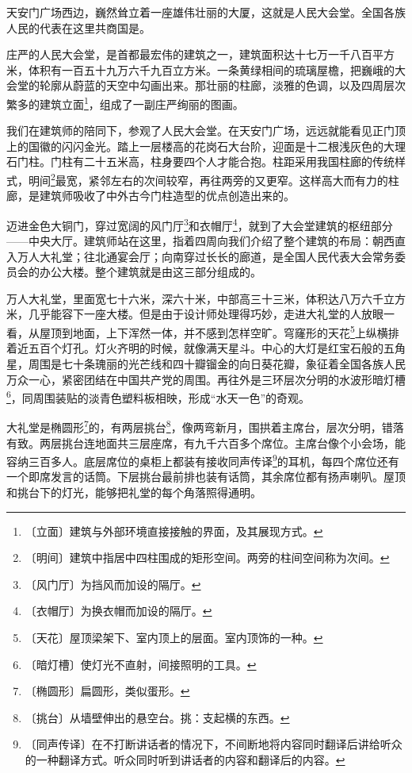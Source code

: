 \documentclass[12pt,UTF-8,openany]{ctexbook}
\begin{document}
\begin{large}
    
    天安门广场西边，巍然耸立着一座雄伟壮丽的大厦，这就是人民大会堂。全国各族人民的代表在这里共商国是。
    
    庄严的人民大会堂，是首都最宏伟的建筑之一，建筑面积达十七万一千八百平方米，体积有一百五十九万六千九百立方米。一条黄绿相间的琉璃屋檐，把巍峨的大会堂的轮廓从蔚蓝的天空中勾画出来。那壮丽的柱廊，淡雅的色调，以及四周层次繁多的建筑立面\footnote{〔立面〕建筑与外部环境直接接触的界面，及其展现方式。}，组成了一副庄严绚丽的图画。
    
    我们在建筑师的陪同下，参观了人民大会堂。在天安门广场，远远就能看见正门顶上的国徽的闪闪金光。踏上一层楼高的花岗石大台阶，迎面是十二根浅灰色的大理石门柱。门柱有二十五米高，柱身要四个人才能合抱。柱距采用我国柱廊的传统样式，明间\footnote{〔明间〕建筑中指居中四柱围成的矩形空间。两旁的柱间空间称为次间。}最宽，紧邻左右的次间较窄，再往两旁的又更窄。这样高大而有力的柱廊，是建筑师吸收了中外古今门柱造型的优点创造出来的。
    
    迈进金色大铜门，穿过宽阔的风门厅\footnote{〔风门厅〕为挡风而加设的隔厅。}和衣帽厅\footnote{〔衣帽厅〕为换衣帽而加设的隔厅。}，就到了大会堂建筑的枢纽部分——中央大厅。建筑师站在这里，指着四周向我们介绍了整个建筑的布局：朝西直入万人大礼堂；往北通宴会厅；向南穿过长长的廊道，是全国人民代表大会常务委员会的办公大楼。整个建筑就是由这三部分组成的。
    
    万人大礼堂，里面宽七十六米，深六十米，中部高三十三米，体积达八万六千立方米，几乎能容下一座大楼。但是由于设计师处理得巧妙，走进大礼堂的人放眼一看，从屋顶到地面，上下浑然一体，并不感到怎样空旷。穹窿形的天花\footnote{〔天花〕屋顶梁架下、室内顶上的层面。室内顶饰的一种。}上纵横排着近五百个灯孔。灯火齐明的时候，就像满天星斗。中心的大灯是红宝石般的五角星，周围是七十条瑰丽的光芒线和四十瓣镏金的向日葵花瓣，象征着全国各族人民万众一心，紧密团结在中国共产党的周围。再往外是三环层次分明的水波形暗灯槽\footnote{〔暗灯槽〕使灯光不直射，间接照明的工具。}，同周围装贴的淡青色塑料板相映，形成“水天一色”的奇观。
    
    大礼堂是椭圆形\footnote{〔椭圆形〕扁圆形，类似蛋形。}的，有两层挑台\footnote{〔挑台〕从墙壁伸出的悬空台。挑：支起横的东西。}，像两弯新月，围拱着主席台，层次分明，错落有致。两层挑台连地面共三层座席，有九千六百多个席位。主席台像个小会场，能容纳三百多人。底层席位的桌柜上都装有接收同声传译\footnote{〔同声传译〕在不打断讲话者的情况下，不间断地将内容同时翻译后讲给听众的一种翻译方式。听众同时听到讲话者的内容和翻译后的内容。}的耳机，每四个席位还有一个即席发言的话筒。下层挑台最前排也装有话筒，其余席位都有扬声喇叭。屋顶和挑台下的灯光，能够把礼堂的每个角落照得通明。
    

\end{large}
\end{document}
